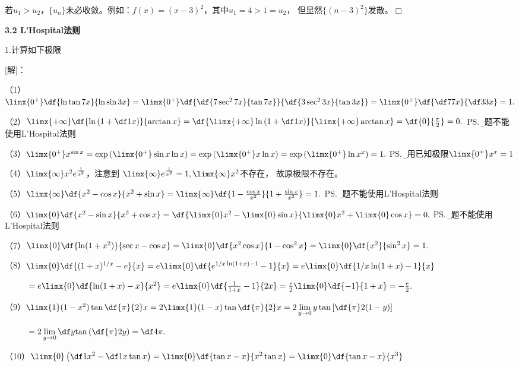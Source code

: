 若$u_1>u_2$，$\{u_n\}$未必收敛。例如：$f(x)=(x-3)^2$，其中$u_1=4>1=u_2$，
但显然$\{(n-3)^2\}$发散。\hfill$\Box$

\begin{center}
	\bf 3.2 L'Hospital法则
\end{center}

\bigskip

1.计算如下极限

[解]：

（1）$\limx{0^+}\df{\ln\tan 7x}{\ln\sin 3x}=\limx{0^+}\df{\df{7\sec^27x}{\tan7x}}{\df{3\sec^23x}{\tan3x}}
=\limx{0^+}\df{\df7{7x}}{\df3{3x}}=1.$

（2）$\limx{+\infty}\df{\ln\left(1+\df1x\right)}{\arctan x}
=\df{\limx{+\infty}\ln\left(1+\df1x\right)}{\limx{+\infty}\arctan
x}=\df{0}{\frac{\pi}2}=0.$
\ps{\b 本题不能使用L'Hospital法则}

（3）$\limx{0^+}x^{\sin x}=\exp\left(\limx{0^+}\sin x\ln x\right)
=\exp\left(\limx{0^+}x\ln x\right)=\exp\left(\limx{0^+}\ln x^x\right)
=1.$
\ps{\b 使用已知极限$\limx{0^+}x^x=1$}

（4）$\limx{\infty}x^2e^{\frac1{x^2}}$，注意到
$\limx{\infty}e^{\frac1{x^2}}=1,\limx{\infty}x^2$不存在，
故原极限不存在。

（5）$\limx{\infty}\df{x^2-\cos x}{x^2+\sin x}
=\limx{\infty}\df{1-\frac{\cos x}{x^2}}{1+\frac{\sin x}{x^2}}=1.$
\ps{\b 本题不能使用L'Hospital法则}

（6）$\limx{0}\df{x^2-\sin x}{x^2+\cos x}
=\df{\limx{0}x^2-\limx{0}\sin x}{\limx{0}x^2+\limx{0}\cos x}=0.$
\ps{\b 本题不能使用L'Hospital法则}

（7）$\limx{0}\df{\ln(1+x^2)}{\sec x-\cos x}
=\limx{0}\df{x^2\cos x}{1-\cos^2 x}
=\limx{0}\df{x^2}{\sin^2 x}=1.$

（8）$\limx{0}\df{(1+x)^{1/x}-e}{x}
=e\limx{0}\df{e^{1/x\ln(1+x)-1}-1}{x}
=e\limx{0}\df{1/x\ln(1+x)-1}{x}$

$\hspace{1cm} =e\limx{0}\df{\ln(1+x)-x}{x^2}
=e\limx{0}\df{\frac1{1+x}-1}{2x}
=\frac e2\limx{0}\df{-1}{1+x}=-\frac e2.
$
 
（9）$\limx{1}(1-x^2)\tan\df{\pi}{2}x
=2\limx{1}(1-x)\tan\df{\pi}{2}x
=2\lim\limits_{y\to0}y\tan\left[\df{\pi}2(1-y)\right]$

$\hspace{1cm}
=2\lim\limits_{y\to0}\df y{\tan\left(\df{\pi}2y\right)}
=\df4{\pi}.$
 
（10）$\limx{0}\left(\df 1{x^2}-\df 1{x\tan x}\right)
=\limx{0}\df {\tan x-x}{x^2\tan x}
=\limx{0}\df {\tan x-x}{x^3}$

